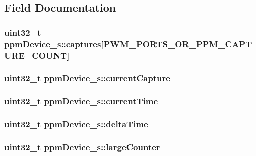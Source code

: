 \subsection{Field Documentation}
\hypertarget{structppmDevice__s_a0be72d915b8391f6e28d40e49c1fc376}{
\subsubsection[{captures}]{\setlength{\rightskip}{0pt plus 5cm}uint32\+\_\+t ppm\+Device\+\_\+s\+::captures\mbox{[}{\bf P\+W\+M\+\_\+\+P\+O\+R\+T\+S\+\_\+\+O\+R\+\_\+\+P\+P\+M\+\_\+\+C\+A\+P\+T\+U\+R\+E\+\_\+\+C\+O\+U\+N\+T}\mbox{]}}}\label{structppmDevice__s_a0be72d915b8391f6e28d40e49c1fc376}
\hypertarget{structppmDevice__s_a5162a8e31e09554fc130ad99afd28a3e}{
\subsubsection[{current\+Capture}]{\setlength{\rightskip}{0pt plus 5cm}uint32\+\_\+t ppm\+Device\+\_\+s\+::current\+Capture}}\label{structppmDevice__s_a5162a8e31e09554fc130ad99afd28a3e}
\hypertarget{structppmDevice__s_ac2682c776ebf6602c299a24c4a8b2dd4}{
\subsubsection[{current\+Time}]{\setlength{\rightskip}{0pt plus 5cm}uint32\+\_\+t ppm\+Device\+\_\+s\+::current\+Time}}\label{structppmDevice__s_ac2682c776ebf6602c299a24c4a8b2dd4}
\hypertarget{structppmDevice__s_ae268beff5080ded556ff76109a2cb4bb}{
\subsubsection[{delta\+Time}]{\setlength{\rightskip}{0pt plus 5cm}uint32\+\_\+t ppm\+Device\+\_\+s\+::delta\+Time}}\label{structppmDevice__s_ae268beff5080ded556ff76109a2cb4bb}
\hypertarget{structppmDevice__s_ae9d0b3ac12ab54935acb6b7fa5a952b2}{
\subsubsection[{large\+Counter}]{\setlength{\rightskip}{0pt plus 5cm}uint32\+\_\+t ppm\+Device\+\_\+s\+::large\+Counter}}\label{structppmDevice__s_ae9d0b3ac12ab54935acb6b7fa5a952b2}
